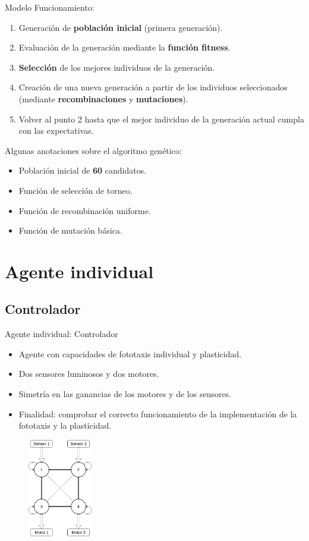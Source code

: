 \documentclass[aspectratio=169]{beamer}
\begin{document}
\begin{frame}{Modelo}
Funcionamiento:
  \begin{enumerate}
    \item Generación de \textbf{población inicial} (primera generación).
    \item Evaluación de la generación mediante la \textbf{función fitness}.
    \item \textbf{Selección} de los mejores individuos de la generación.
    \item Creación de una nueva generación a partir de los individuos seleccionados (mediante \textbf{recombinaciones} y \textbf{mutaciones}).
    \item Volver al punto 2 hasta que el mejor individuo de la generación actual cumpla con las expectativas.
  \end{enumerate}
  Algunas anotaciones sobre el algoritmo genético:
  \begin{itemize}
    \item Población inicial de \textbf{60} candidatos.
    \item Función de selección de torneo.
    \item Función de recombinación uniforme.
    \item Función de mutación básica.
  \end{itemize}
\end{frame}

\section{Agente individual}
\subsection{Controlador}
\begin{frame}{Agente individual: Controlador}
  \begin{itemize}
    \item Agente con capacidades de fototaxis individual y plasticidad.
    \item Dos sensores luminosos y dos motores.
    \item Simetría en las ganancias de los motores y de los sensores.
    \item Finalidad: comprobar el correcto funcionamiento de la implementación de la fototaxis y la plasticidad.
  \end{itemize}
  \begin{figure}
    \centering
  \includegraphics[width=0.25\textwidth,height=0.5\textheight]{Imagenes/Agent0Controller}
\end{figure}
\end{frame}
\end{document}
